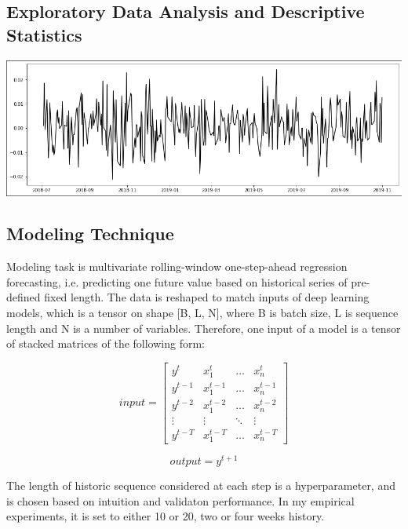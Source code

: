 \documentclass[stu]{apa7}
\begin{document}
\subsection{Exploratory Data Analysis and Descriptive Statistics}

\includegraphics[width=\textwidth]{series.png}

\subsection{Modeling Technique}

Modeling task is multivariate rolling-window one-step-ahead regression forecasting, i.e. predicting one future value based on historical series of pre-defined fixed length. The data is reshaped to match inputs of deep learning models, which is a tensor on shape [B, L, N], where B is batch size, L is sequence length and N is a number of variables. Therefore, one input of a model is a tensor of stacked matrices of the following form:

\begin{equation}
input = \begin{bmatrix}
		y^{t} & x_{1}^{t} & \dots & x_{n}^{t} \\[1ex]
		y^{t-1} & x_{1}^{t-1} & \dots & x_{n}^{t-1} \\[1ex]
		y^{t-2} & x_{1}^{t-2} & \dots & x_{n}^{t-2} \\[1ex]
		\vdots & \vdots & \ddots & \vdots \\[1ex]
		y^{t-T} & x_{1}^{t-T} & \dots & x_{n}^{t-T}
\end{bmatrix}
\end{equation}

\begin{equation}
output = y^{t+1}
\end{equation}

The length of historic sequence considered at each step is a hyperparameter, and is chosen based on intuition and validaton performance. In my empirical experiments, it is set to either 10 or 20, two or four weeks history.
\end{document}

